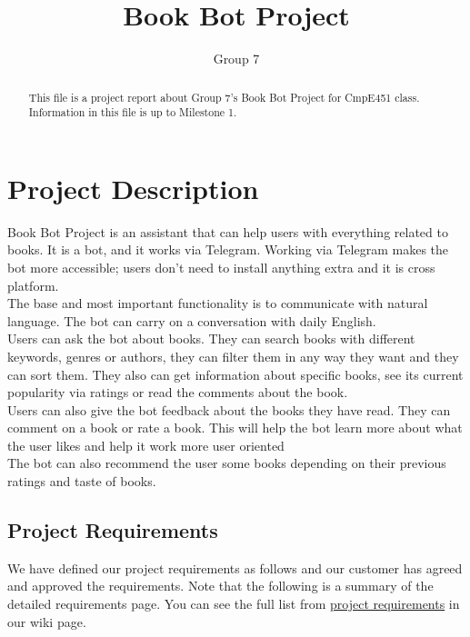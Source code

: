 \documentclass[a4paper]{article}
\title{Book Bot Project}
\author{Group 7}
\begin{document}
\maketitle

\begin{abstract}
This file is a project report about Group 7's Book Bot Project for CmpE451 class. Information in this file is up to Milestone 1.
\end{abstract}

\section{Project Description}

  Book Bot Project is an assistant that can help users with everything related to books. It is a bot, and it works via Telegram. Working via Telegram makes the bot more accessible; users don't need to install anything extra and it is cross platform. \\
  The base and most important functionality is to communicate with natural language. The bot can carry on a conversation with daily English. \\
  Users can ask the bot about books. They can search books with different keywords, genres or authors, they can filter them in any way they want and they can sort them. They also can get information about specific books, see its current popularity via ratings or read the comments about the book.\\
  Users can also give the bot feedback about the books they have read. They can comment on a book or rate a book. This will help the bot learn more about what the user likes and help it work more user oriented \\
  The bot can also recommend the user some books depending on their previous ratings and taste of books.

\subsection{Project Requirements}

We have defined our project requirements as follows and our customer has agreed and approved the requirements. Note that the following is a summary of the detailed requirements page. You can see the full list from \href{https://github.com/bounswe/bounswe2017group7/wiki/Project-Requirements}{project requirements} in our wiki page.
\end{document}
